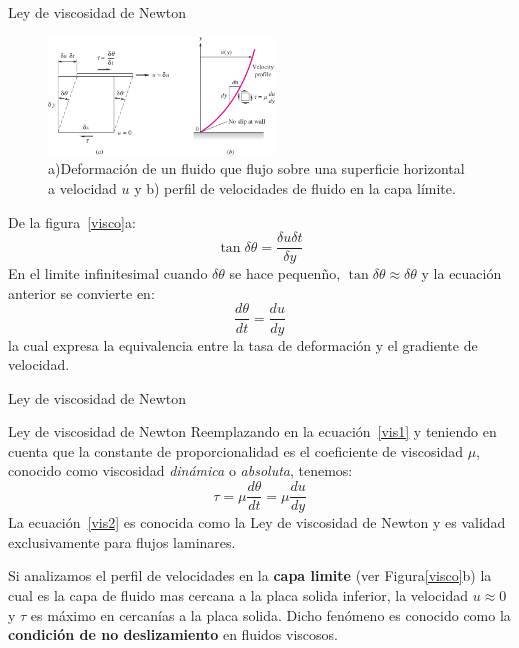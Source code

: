 \documentclass [xcolor=svgnames, t] {beamer}
\begin{document}
\begin{frame}{Ley de viscosidad de Newton}
\small
\vspace{-0.4cm}
\begin{figure}[h]
\centering
\includegraphics[width=6cm]{visco}
\caption{a)Deformaci\'on de un fluido que flujo sobre una superficie horizontal a velocidad $u$ y  b) perfil de velocidades de fluido en la capa l\'imite.}
\end{figure}
\vspace{-0.4cm}
De la figura~\ref{visco}a:
$$
\tan \delta \theta = \frac{\delta u \delta t}{\delta y}
$$
En el limite infinitesimal cuando $\delta \theta$ se hace pequen\~no, $\tan \delta \theta \approx \delta \theta$ y la ecuaci\'on anterior se convierte en:
$$
\frac{d\theta}{dt}=\frac{du}{dy}
$$
la cual expresa la equivalencia entre la tasa de deformaci\'on y el gradiente de velocidad.

\end{frame}

\begin{frame}{Ley de viscosidad de Newton}
\begin{block}{Ley de viscosidad de Newton}
Reemplazando en la ecuaci\'on~\ref{vis1} y teniendo en cuenta que la constante de proporcionalidad es el coeficiente de viscosidad $\mu$, conocido como viscosidad \emph{din\'amica} o \emph{absoluta}, tenemos:
\begin{equation}
\tau = \mu \frac{d \theta}{d t} = \mu \frac{d u}{d y}
\label{vis2}
\end{equation}
La ecuaci\'on~\ref{vis2} es conocida como la Ley de viscosidad de Newton y es validad exclusivamente para flujos laminares.
\end{block}
Si analizamos el perfil de velocidades en la \textbf{capa limite} (ver Figura\ref{visco}b) la cual es la capa de fluido mas cercana a la placa solida inferior, la velocidad $u \approx 0$ y $\tau$ es m\'aximo en cercan\'ias a la placa solida. Dicho fen\'omeno es conocido como la \textbf{condici\'on de no deslizamiento} en fluidos viscosos. 

\end{frame}
\end{document}
